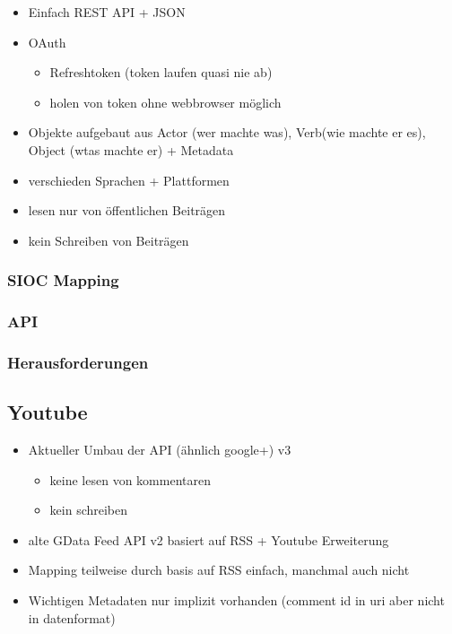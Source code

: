 \begin{itemize}
    \item Einfach REST API + JSON
    \item OAuth
    \begin{itemize}
        \item Refreshtoken (token laufen quasi nie ab)
        \item holen von token ohne webbrowser möglich
    \end{itemize}
    \item Objekte aufgebaut aus Actor (wer machte was), Verb(wie machte er es), Object (wtas machte er) + Metadata
    \item verschieden Sprachen + Plattformen
    \item lesen nur von öffentlichen Beiträgen
    \item kein Schreiben von Beiträgen
\end{itemize}

\subsubsection{SIOC Mapping} %
\label{ssub:google_plus_sioc_mapping}

\subsubsection{API} %
\label{ssub:google_plus_api}

\subsubsection{Herausforderungen} %
\label{ssub:google_plus_herausforderungen}





\subsection{Youtube } %
\label{sub:youtube_connector}

\begin{itemize}
    \item Aktueller Umbau der API (ähnlich google+) v3
    \begin{itemize}
        \item keine lesen von kommentaren
        \item kein schreiben
    \end{itemize}
    \item alte GData Feed API v2 basiert auf RSS + Youtube Erweiterung
    \item Mapping teilweise durch basis auf RSS einfach, manchmal auch nicht
    \item Wichtigen Metadaten nur implizit vorhanden (comment id in uri aber nicht in datenformat)
\end{itemize}

